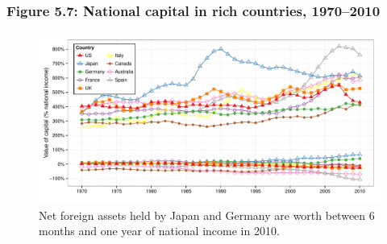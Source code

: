 \documentclass[t]{beamer}\usepackage[]{graphicx}\usepackage[]{color}
\newenvironment{knitrout}{}{} %
\begin{document}
\begin{frame}[label=Figure_5_7]
\frametitle{Figure 5.7: National capital in rich countries, 1970--2010}
\begin{figure}[t]
\begin{minipage}[b]{\textwidth}
\centering
\begin{knitrout}\footnotesize
{}\color{fgcolor}

{\centering \includegraphics[width=1\linewidth,height=0.75\textheight]{figures/color/Figure_5_7} 

}



\end{knitrout}
\caption{Net foreign assets held by Japan and Germany are worth between 6 months and one year of national income in 2010.}
\end{minipage}
\end{figure}
\end{frame}
\end{document}
